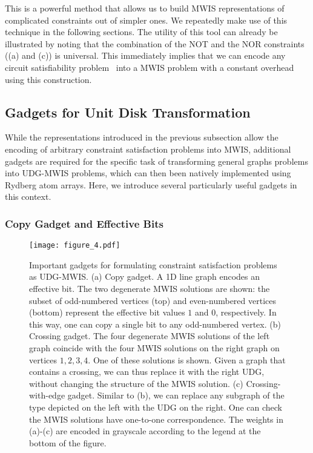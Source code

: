 This is a powerful method that allows us to build MWIS representations of complicated constraints out of simpler ones.  We repeatedly make use of this technique in the following sections. The utility of this tool can already be illustrated by noting that the combination of the NOT and the NOR constraints ((a) and (c)) is universal. This immediately implies that we can encode any circuit satisfiability problem~\cite{Moore2011} into a MWIS problem with a constant overhead using this construction.

\subsection{Gadgets for Unit Disk Transformation} \label{gadgets}

While the representations introduced in the previous subsection allow the encoding of arbitrary constraint satisfaction problems into MWIS, additional gadgets are required for the specific task of transforming general graphs problems into UDG-MWIS problems, which can then been natively implemented using Rydberg atom arrays. Here, we introduce several particularly useful gadgets in this context.

\subsubsection{Copy Gadget and Effective Bits} \label{copy-gadget section}

\begin{figure}
\hspace{-0.1cm}
    \texttt{[image: figure\_4.pdf]}
  \caption{Important gadgets for formulating constraint satisfaction problems as UDG-MWIS. (a) Copy gadget. A 1D line graph encodes an effective bit. The two degenerate MWIS solutions are shown: the subset of odd-numbered vertices (top) and even-numbered vertices (bottom) represent the effective bit values $1$ and $0$, respectively. In this way, one can copy a single bit to any odd-numbered vertex. (b) Crossing gadget. The four degenerate MWIS solutions of the left graph coincide with the four MWIS solutions on the right graph on vertices $1,2,3,4$. One of these solutions is shown. Given a graph that contains a crossing, we can thus replace it with the right UDG, without changing the structure of the MWIS solution. (c) Crossing-with-edge gadget. Similar to (b), we can replace any subgraph of the type depicted on the left with the UDG on the right. One can check the MWIS solutions have one-to-one correspondence. The weights in (a)-(c) are encoded in grayscale according to the legend at the bottom of the figure.}
    \label{fig:udg-gadgets}
\end{figure}

